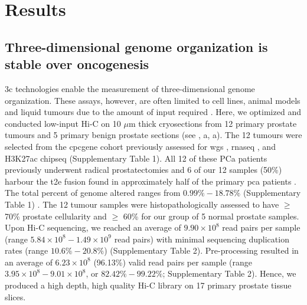\section{Results}

\subsection{Three-dimensional genome organization is stable over oncogenesis}

\Gls{3c} technologies enable the measurement of three-dimensional genome organization.
These assays, however, are often limited to cell lines, animal models and liquid tumours due to the amount of input required \cite{liebermanaidenComprehensiveMappingLongRange2009}.
Here, we optimized and conducted low-input Hi-C \cite{diazChromatinConformationAnalysis2018} on 10 $\mu$m thick cryosections from 12 primary prostate tumours and 5 primary benign prostate sections (see , a, a).
The 12 tumours were selected from the \gls{cpcgene} cohort previously assessed for \gls{wgs} \cite{fraserGenomicHallmarksLocalized2017}, \gls{rnaseq} \cite{chenWidespreadFunctionalRNA2019}, and H3K27ac \gls{chipseq} \cite{kronTMPRSS2ERGFusion2017,mazrooeiCistromePartitioningReveals2019} (Supplementary Table 1).
All 12 of these PCa patients previously underwent radical prostatectomies and 6 of our 12 samples (50\%) harbour the \gls{t2e} fusion found in approximately half of the primary \gls{pca} patients \cite{fraserGenomicHallmarksLocalized2017}.
The total percent of genome altered ranges from $0.99\%-18.78\%$ (Supplementary Table 1) \cite{fraserGenomicHallmarksLocalized2017}.
The 12 tumour samples were histopathologically assessed to have $\ge$ 70\% prostate cellularity and $\ge$ 60\% for our group of 5 normal prostate samples.
Upon Hi-C sequencing, we reached an average of $9.90 \times 10^8$  read pairs per sample (range $5.84 \times 10^8 - 1.49 \times 10^9$ read pairs) with minimal sequencing duplication rates (range $10.6\% - 20.8\%$) (Supplementary Table 2).
Pre-processing resulted in an average of $6.23 \times 10^8$ (96.13\%) valid read pairs per sample (range $3.95 \times 10^8 - 9.01 \times 10^8$, or $82.42\% - 99.22\%$; Supplementary Table 2).
Hence, we produced a high depth, high quality Hi-C library on 17 primary prostate tissue slices.


